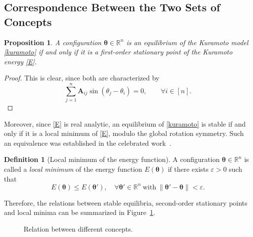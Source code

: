 \documentclass[11pt,reqno]{amsart}
\newtheorem{proposition}[theorem]{Proposition}
\theoremstyle{definition}
\newtheorem{definition}[theorem]{Definition}
\begin{document}
\subsection{Correspondence Between the Two Sets of Concepts}
\begin{proposition}
    A configuration $\boldsymbol{\theta}\in\mathbb R^n$ is an equilibrium of the Kuramoto model \eqref{kuramoto} if and only if it is a first-order stationary point of the Kuramoto energy \eqref{E}.
\end{proposition}
\begin{proof}
    This is clear, since both are characterized by $$\sum_{j=1}^n \boldsymbol A_{ij} \sin(\theta_j - \theta_i) = 0,\qquad \forall i \in [n].$$
\end{proof}

Moreover, since \eqref{E} is real analytic, an equilibrium of \eqref{kuramoto} is stable if and only if it is a local minimum of \eqref{E}, modulo the global rotation symmetry.
Such an equivalence was established in the celebrated work~\cite{Absil2006StableEquilibrium}.

\begin{definition}[Local minimum of the energy function]
A configuration $\boldsymbol\theta \in \mathbb{R}^n$ is called a \emph{local minimum} of the energy function $E(\boldsymbol\theta)$ if there exists $\varepsilon > 0$ such that
\[
E(\boldsymbol\theta) \leq E(\boldsymbol\theta'), \quad \forall \boldsymbol\theta' \in \mathbb{R}^n \ \text{with}\ \|\boldsymbol\theta'-\boldsymbol\theta\| < \varepsilon.
\]
\end{definition}

Therefore, the relations between stable equilibria, second-order stationary points and local minima can be summarized in Figure~\ref{equivalence-gradient}.

\begin{figure}[H]
\centering
{}
\caption{Relation between different concepts.}
\label{equivalence-gradient}
\end{figure}
\end{document}
